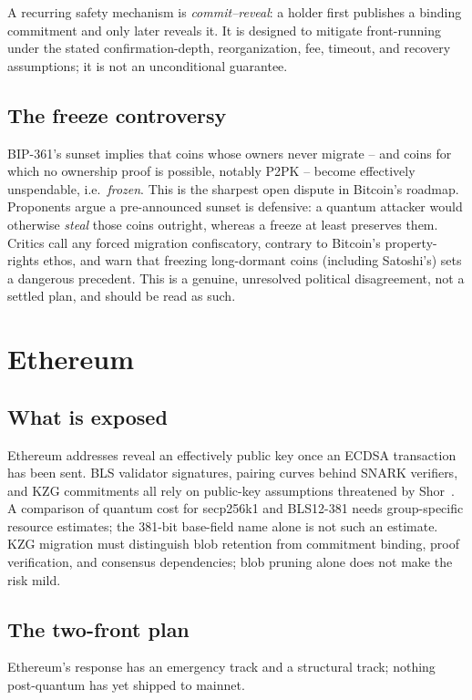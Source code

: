A recurring safety mechanism is \emph{commit--reveal}: a holder first publishes a
binding commitment and only later reveals it. It is designed to mitigate front-running
under the stated confirmation-depth, reorganization, fee, timeout, and recovery
assumptions; it is not an unconditional guarantee.

\subsection{The freeze controversy}
\label{sec:freeze}
BIP-361's sunset implies that coins whose owners never migrate -- and coins for which no ownership proof is possible, notably P2PK -- become effectively unspendable, i.e.\ \emph{frozen}. This is the sharpest open dispute in Bitcoin's roadmap. Proponents argue a pre-announced sunset is defensive: a quantum attacker would otherwise \emph{steal} those coins outright, whereas a freeze at least preserves them. Critics call any forced migration confiscatory, contrary to Bitcoin's property-rights ethos, and warn that freezing long-dormant coins (including Satoshi's) sets a dangerous precedent. This is a genuine, unresolved political disagreement, not a settled plan, and should be read as such.

\section{Ethereum}
\subsection{What is exposed}
Ethereum addresses reveal an effectively public key once an ECDSA transaction has been
sent. BLS validator signatures, pairing curves behind SNARK verifiers, and KZG
commitments all rely on public-key assumptions threatened by Shor~\cite{ethpqroadmap,quantumhorizon2026}.
A comparison of quantum cost for secp256k1 and BLS12-381 needs group-specific resource
estimates; the 381-bit base-field name alone is not such an estimate. KZG migration
must distinguish blob retention from commitment binding, proof verification, and
consensus dependencies; blob pruning alone does not make the risk mild.

\subsection{The two-front plan}
\label{sec:eth-two-front}
Ethereum's response has an emergency track and a structural track; nothing post-quantum has yet shipped to mainnet.

